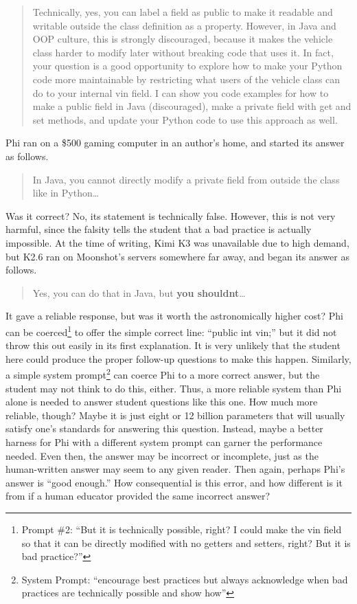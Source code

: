 \begin{quote}
Technically, yes, you can label a field as public to make it readable and writable outside the class definition as a property. However, in Java and OOP culture, this is strongly discouraged, because it makes the vehicle class harder to modify later without breaking code that uses it. In fact, your question is a good opportunity to explore how to make your Python code more maintainable by restricting what users of the vehicle class can do to your internal vin field. I can show you code examples for how to make a public field in Java (discouraged), make a private field with get and set methods, and update your Python code to use this approach as well.
\end{quote}

Phi ran on a \$500 gaming computer in an author's home, and started its answer as follows.

\begin{quote}
In Java, you cannot directly modify a private field from outside the class like in Python\ldots{}
\end{quote}

Was it correct? No, its statement is technically false. However, this is not very harmful, since the falsity tells the student that a bad practice is actually impossible. At the time of writing, Kimi K3 was unavailable due to high demand, but K2.6 ran on Moonshot's servers somewhere far away, and began its answer as follows.

\begin{quote}
Yes, you can do that in Java, but \textbf{you shouldn\textquotesingle t}\ldots{}
\end{quote}

It gave a reliable response, but was it worth the astronomically higher cost? Phi can be coerced\footnote{Prompt \#2: ``But it is technically possible, right? I could make the vin field so that it can be directly modified with no getters and setters, right? But it is bad practice?''} to offer the simple correct line: ``public int vin;'' but it did not throw this out easily in its first explanation. It is very unlikely that the student here could produce the proper follow-up questions to make this happen. Similarly, a simple system prompt\footnote{System Prompt: ``encourage best practices but always acknowledge when bad practices are technically possible and show how''} can coerce Phi to a more correct answer, but the student may not think to do this, either. Thus, a more reliable system than Phi alone is needed to answer student questions like this one. How much more reliable, though? Maybe it is just eight or 12 billion parameters that will usually satisfy one's standards for answering this question. Instead, maybe a better harness for Phi with a different system prompt can garner the performance needed. Even then, the answer may be incorrect or incomplete, just as the human-written answer may seem to any given reader. Then again, perhaps Phi's answer is ``good enough.'' How consequential is this error, and how different is it from if a human educator provided the same incorrect answer?


